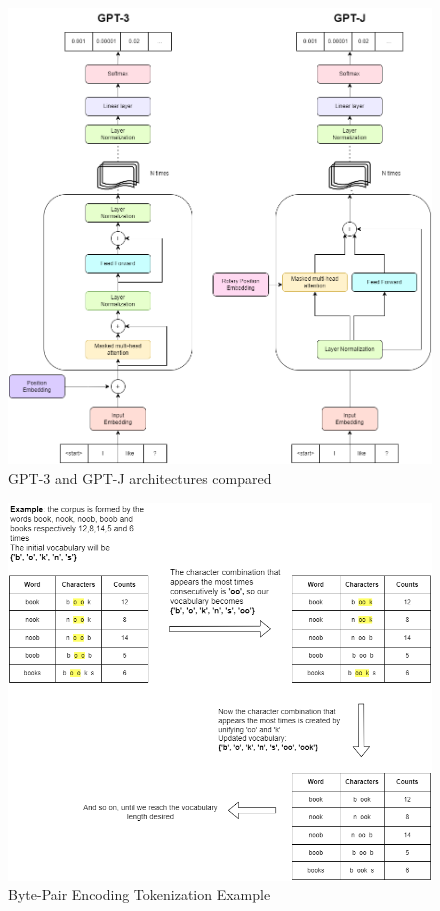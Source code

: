 \begin{figure}[h] 
    \includegraphics[width=\textwidth]{images/gptJ_vs_gpt_architecture.drawio.png}
    \caption{GPT-3 and GPT-J architectures compared}
    \label{fig:gpt-architectures}
\end{figure}    

\begin{figure}[h] 
    \includegraphics[width=\textwidth]{images/byte_pair.drawio.png}
    \caption{Byte-Pair Encoding Tokenization Example}
    \label{fig:Byte_Pair_Encoding}
\end{figure}    


